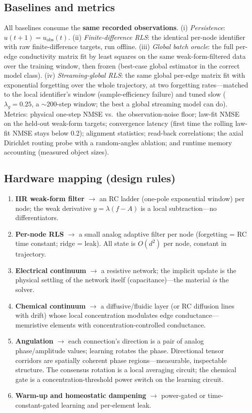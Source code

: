 \documentclass[11pt]{article}
\begin{document}
\subsection{Baselines and metrics}
All baselines consume the \textbf{same recorded observations}. (i) \emph{Persistence}:
$\hat u(t+1) = u_{\mathrm{obs}}(t)$. (ii) \emph{Finite-difference RLS}: the identical
per-node identifier with raw finite-difference targets, run offline. (iii) \emph{Global
batch oracle}: the full per-edge conductivity matrix fit by least squares on the same
weak-form-filtered data over the training window, then frozen (best-case global
estimator in the correct model class). (iv) \emph{Streaming-global RLS}: the same
global per-edge matrix fit with exponential forgetting over the whole trajectory, at
two forgetting rates---matched to the local identifier's window (sample-efficiency
failure) and tuned slow ($\lambda_g = 0.25$, a ${\sim}200$-step window; the best a
global streaming model can do). Metrics: physical one-step NMSE vs.\ the
observation-noise floor; law-fit NMSE on the held-out weak-form targets; convergence
latency (first time the rolling law-fit NMSE stays below 0.2); alignment statistics;
read-back correlations; the axial Dirichlet routing probe with a random-angles
ablation; and runtime memory accounting (measured object sizes).

\subsection{Hardware mapping (design rules)}
\begin{enumerate}
\item \textbf{IIR weak-form filter} $\to$ an RC ladder (one-pole exponential window)
per node; the weak derivative $y = \lambda(f - A)$ is a local subtraction---no
differentiators.
\item \textbf{Per-node RLS} $\to$ a small analog adaptive filter per node (forgetting =
RC time constant; ridge = leak). All state is $O(d^2)$ per node, constant in
trajectory.
\item \textbf{Electrical continuum} $\to$ a resistive network; the implicit update is
the physical settling of the network itself (capacitance)---the material \emph{is} the
solver.
\item \textbf{Chemical continuum} $\to$ a diffusive/fluidic layer (or RC diffusion
lines with drift) whose local concentration modulates edge conductance---memristive
elements with concentration-controlled conductance.
\item \textbf{Angulation} $\to$ each connection's direction is a pair of analog
phase/amplitude values; learning rotates the phase. Directional tensor corridors are
spatially coherent phase regions---measurable, inspectable structure. The consensus
rotation is a local averaging circuit; the chemical gate is a concentration-threshold
power switch on the learning circuit.
\item \textbf{Warm-up and homeostatic dampening} $\to$ power-gated or
time-constant-gated learning and per-element leak.
\end{enumerate}
\end{document}

